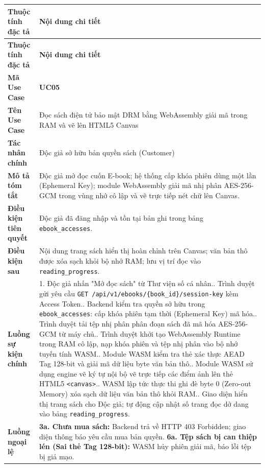 \documentclass[11pt, a4paper]{report}
\begin{document}
\begin{longtable}{p{3.8cm} p{10.5cm}}
\toprule
\textbf{Thuộc tính đặc tả} & \textbf{Nội dung chi tiết} \\
\midrule
\endfirsthead
\toprule
\textbf{Thuộc tính đặc tả} & \textbf{Nội dung chi tiết} \\
\midrule
\endhead
\bottomrule
\endfoot
\textbf{Mã Use Case} & \textbf{UC05} \\
\midrule
\textbf{Tên Use Case} & Đọc sách điện tử bảo mật DRM bằng WebAssembly giải mã trong RAM và vẽ lên HTML5 Canvas \\
\midrule
\textbf{Tác nhân chính} & Độc giả sở hữu bản quyền sách (Customer) \\
\midrule
\textbf{Mô tả tóm tắt} & Độc giả mở đọc cuốn E-book; hệ thống cấp khóa phiên dùng một lần (Ephemeral Key); module WebAssembly giải mã nhị phân AES-256-GCM trong vùng nhớ cô lập và vẽ trực tiếp nét chữ lên Canvas. \\
\midrule
\textbf{Điều kiện tiên quyết} & Độc giả đã đăng nhập và tồn tại bản ghi trong bảng \texttt{ebook\_accesses}. \\
\midrule
\textbf{Điều kiện sau} & Nội dung trang sách hiển thị hoàn chỉnh trên Canvas; văn bản thô được xóa sạch khỏi bộ nhớ RAM; lưu vị trí đọc vào \texttt{reading\_progress}. \\
\midrule
\textbf{Luồng sự kiện chính} & 
1. Độc giả nhấn "Mở đọc sách" từ Thư viện số cá nhân.\newline
2. Trình duyệt gửi yêu cầu \texttt{GET /api/v1/ebooks/\{book\_id\}/session-key} kèm Access Token.\newline
3. Backend kiểm tra quyền sở hữu trong \texttt{ebook\_accesses}: cấp khóa phiên tạm thời (Ephemeral Key) mã hóa.\newline
4. Trình duyệt tải tệp nhị phân phân đoạn sách đã mã hóa AES-256-GCM từ máy chủ.\newline
5. Trình duyệt khởi tạo WebAssembly Runtime trong RAM cô lập, nạp khóa phiên và tệp nhị phân vào bộ nhớ tuyến tính WASM.\newline
6. Module WASM kiểm tra thẻ xác thực AEAD Tag 128-bit và giải mã dữ liệu byte văn bản thô.\newline
7. Module WASM sử dụng engine vẽ ký tự nội bộ vẽ trực tiếp các điểm ảnh lên thẻ HTML5 \texttt{<canvas>}.\newline
8. WASM lập tức thực thi ghi đè byte 0 (Zero-out Memory) xóa sạch dữ liệu văn bản thô khỏi RAM.\newline
9. Giao diện hiển thị trang sách cho Độc giả; tự động cập nhật số trang đọc dở dang vào bảng \texttt{reading\_progress}. \\
\midrule
\textbf{Luồng ngoại lệ} & 
\textbf{3a. Chưa mua sách:} Backend trả về HTTP 403 Forbidden; giao diện thông báo yêu cầu mua bản quyền.\newline
\textbf{6a. Tệp sách bị can thiệp lén (Sai thẻ Tag 128-bit):} WASM hủy phiên giải mã, báo lỗi tệp bị giả mạo. \\
\bottomrule
\end{longtable}
\end{document}

